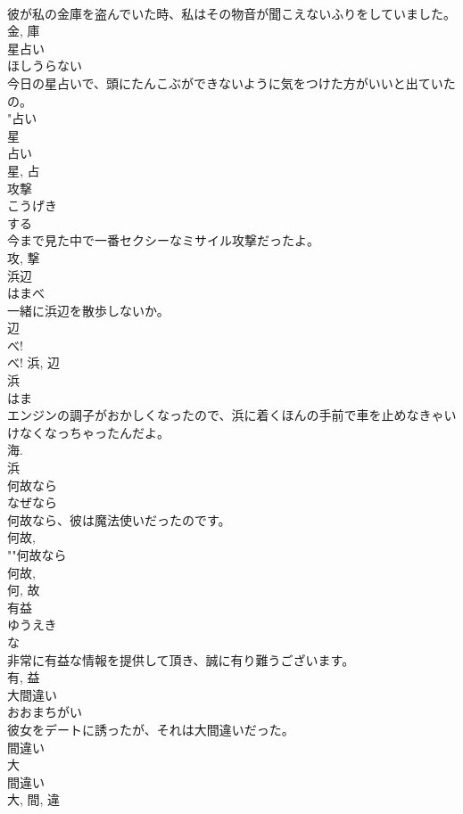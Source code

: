 \documentclass[8pt]{extreport}
\begin{document}
\begin{CJK}{UTF8}{min}
\\	彼が私の金庫を盗んでいた時、私はその物音が聞こえないふりをしていました。	
\\	金, 庫	
\\	星占い	
\\	ほしうらない	
\\	今日の星占いで、頭にたんこぶができないように気をつけた方がいいと出ていたの。	
\\	"占い 
\\	星 
\\	占い 
\\	星, 占	
\\	攻撃	
\\	こうげき	
\\	する 
\\	今まで見た中で一番セクシーなミサイル攻撃だったよ。	
\\	攻, 撃	
\\	浜辺	
\\	はまべ	
\\	一緒に浜辺を散歩しないか。	
\\	辺 
\\	べ! 
\\	べ!	浜, 辺	
\\	浜	
\\	はま	
\\	エンジンの調子がおかしくなったので、浜に着くほんの手前で車を止めなきゃいけなくなっちゃったんだよ。	
\\	海.	
\\	浜	
\\	何故なら	
\\	なぜなら	
\\	何故なら、彼は魔法使いだったのです。	
\\	何故, 
\\	""何故なら 
\\	何故, 
\\	何, 故	
\\	有益	
\\	ゆうえき	
\\	な 
\\	非常に有益な情報を提供して頂き、誠に有り難うございます。	
\\	有, 益	
\\	大間違い	
\\	おおまちがい	
\\	彼女をデートに誘ったが、それは大間違いだった。	
\\	間違い 
\\	大 
\\	間違い 
\\	大, 間, 違	

\end{CJK}
\end{document}
